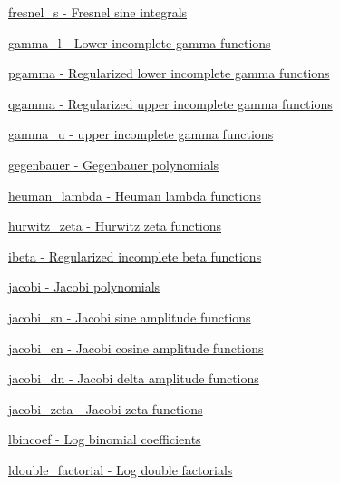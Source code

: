\begin{DoxyItemize}
\item \hyperlink{group__gnu__math__spec__func_gaff40a89f169b1a8962ed0e75587c488b}{fresnel\+\_\+s -\/ Fresnel sine integrals}
\item \hyperlink{group__gnu__math__spec__func_gab3a75d57386806857b5f97c45b4ced6e}{gamma\+\_\+l -\/ Lower incomplete gamma functions}
\item \hyperlink{group__gnu__math__spec__func_gadfb8f84381f7ac3c8d6519961d675c40}{pgamma -\/ Regularized lower incomplete gamma functions}
\item \hyperlink{group__gnu__math__spec__func_ga7b720a59f774ffd416f9be579013ff9d}{qgamma -\/ Regularized upper incomplete gamma functions}
\item \hyperlink{group__gnu__math__spec__func_ga60911c010897719711d563edf69df44a}{gamma\+\_\+u -\/ upper incomplete gamma functions}
\item \hyperlink{group__gnu__math__spec__func_gaf295fecea6e26f1caeb7aa1560e9b7ee}{gegenbauer -\/ Gegenbauer polynomials}
\item \hyperlink{group__gnu__math__spec__func_ga3b606d8617459ef7e5d340db1bae13ec}{heuman\+\_\+lambda -\/ Heuman lambda functions}
\item \hyperlink{group__gnu__math__spec__func_gaed8e8bb0f1755fa7b0786d02ed574347}{hurwitz\+\_\+zeta -\/ Hurwitz zeta functions}
\item \hyperlink{group__gnu__math__spec__func_ga99e687949634408cd1050cceedbdf962}{ibeta -\/ Regularized incomplete beta functions}
\item \hyperlink{group__gnu__math__spec__func_gac7be4bf3c7588f932ce754ee340d0338}{jacobi -\/ Jacobi polynomials}
\item \hyperlink{group__gnu__math__spec__func_gad7e60d39a8b57a427eb8ca31c8d09e10}{jacobi\+\_\+sn -\/ Jacobi sine amplitude functions}
\item \hyperlink{group__gnu__math__spec__func_gaa49fc22cc0f9dde812bab5147fad23ca}{jacobi\+\_\+cn -\/ Jacobi cosine amplitude functions}
\item \hyperlink{group__gnu__math__spec__func_ga2be54b9c153b58a85d5ed9f1d0a02e21}{jacobi\+\_\+dn -\/ Jacobi delta amplitude functions}
\item \hyperlink{group__gnu__math__spec__func_gae22f0fc0fa1cac3bd0d3b3a4b2c33e7e}{jacobi\+\_\+zeta -\/ Jacobi zeta functions}
\item \hyperlink{group__gnu__math__spec__func_gab3eab510cd484f6ec75e968b1d98b818}{lbincoef -\/ Log binomial coefficients}
\item \hyperlink{group__gnu__math__spec__func_gac97a4a380940765948e0663fbc119544}{ldouble\+\_\+factorial -\/ Log double factorials}

\end{DoxyItemize}
